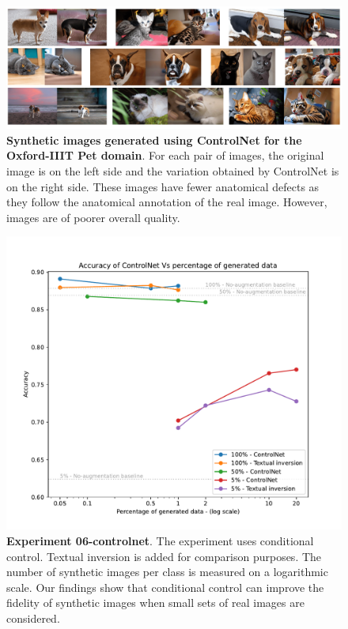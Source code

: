 \begin{figure}
    \centering
    \includegraphics[width=1\textwidth]{Pictures/controlnet-img.png} 
    \caption{\textbf{Synthetic images generated using ControlNet for the Oxford-IIIT Pet domain}. For each pair of images, the original image is on the left side and the variation obtained by ControlNet is on the right side. These images have fewer anatomical defects as they follow the anatomical annotation of the real image. However, images are of poorer overall quality.}
    \label{fig:exp6-images-cont}
\end{figure}

\begin{figure}[ht]
    \centering
    \includegraphics[width=1\textwidth]{Pictures/experiment_006.pdf}
    \caption{\textbf{Experiment 06-controlnet}. The experiment uses conditional control. Textual inversion is added for comparison purposes. The number of synthetic images per class is measured on a logarithmic scale. Our findings show that conditional control can improve the fidelity of synthetic images when small sets of real images are considered.}
    \label{fig:exp6}
\end{figure}

